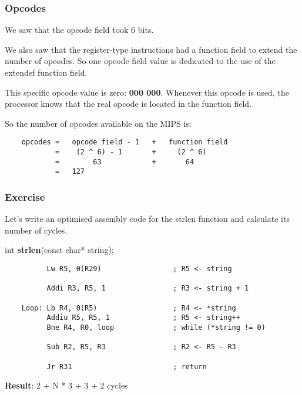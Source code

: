 
\begin{frame}[containsverbatim]
  \frametitle{Opcodes}

  We saw that the opcode field took 6 bits.

  \nl

  We also saw that the register-type instructions had a function field
  to extend the number of opcodes. So one opcode field value is
  dedicated to the use of the extendef function field.

  \nl

  This specific opcode value is zero: \textbf{000 000}. Whenever this
  opcode is used, the processor knows that the real opcode is located
  in the function field.

  \nl

  So the number of opcodes available on the MIPS is:

  \begin{verbatim}
    opcodes =   opcode field - 1   +   function field
            =    (2 ^ 6) - 1       +     (2 ^ 6)
            =        63            +       64
            =   127
  \end{verbatim}
\end{frame}

%
%

\begin{frame}[containsverbatim]
  \frametitle{Exercise}

  Let's write an optimised assembly code for the strlen function and
  calculate its number of cycles.

  \nl

  int \textbf{strlen}(const char* string);

  \begin{verbatim}
          Lw R5, 0(R29)                 ; R5 <- string

          Addi R3, R5, 1                ; R3 <- string + 1

    Loop: Lb R4, 0(R5)                  ; R4 <- *string
          Addiu R5, R5, 1               ; R5 <- string++
          Bne R4, R0, loop              ; while (*string != 0)

          Sub R2, R5, R3                ; R2 <- R5 - R3

          Jr R31                        ; return
  \end{verbatim}

  \textbf{Result}: 2 + N * 3 + 3 + 2 cycles
\end{frame}

